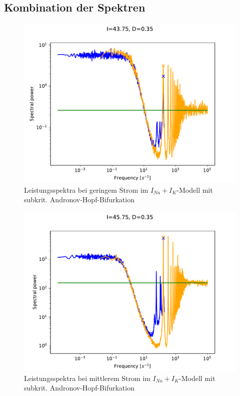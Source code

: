 \documentclass[12pt,a4paper]{article}
\begin{document}
\subsection{Kombination der Spektren}
\begin{figure}[H]
	\centering
	\includegraphics[scale=1]{twofoud35i4375os.pdf}\caption{Leistungsspektra bei geringem Strom im $I_{Na}+I_K$-Modell mit subkrit. Andronov-Hopf-Bifurkation}
	\label{twofoud35small}
\end{figure}
\begin{figure}[H]
	\centering
	\includegraphics[scale=1]{twofoud35i4575os.pdf}\caption{Leistungsspektra bei mittlerem Strom im $I_{Na}+I_K$-Modell mit subkrit. Andronov-Hopf-Bifurkation}
	\label{twofoud35medium}
\end{figure}
\end{document}
